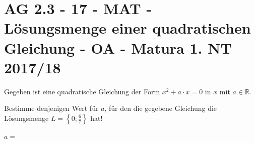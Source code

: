 \section{AG 2.3 - 17 - MAT - Lösungsmenge einer quadratischen Gleichung - OA - Matura 1. NT 2017/18}

\begin{beispiel}[AG 2.3]{1}
Gegeben ist eine quadratische Gleichung der Form $x^2+a\cdot x=0$ in $x$ mit $a\in\mathbb{R}$.

Bestimme denjenigen Wert für $a$, für den die gegebene Gleichung die Lösungsmenge $L=\left\{0;\frac{6}{7}\right\}$ hat!\leer

$a=$\,
\end{beispiel}